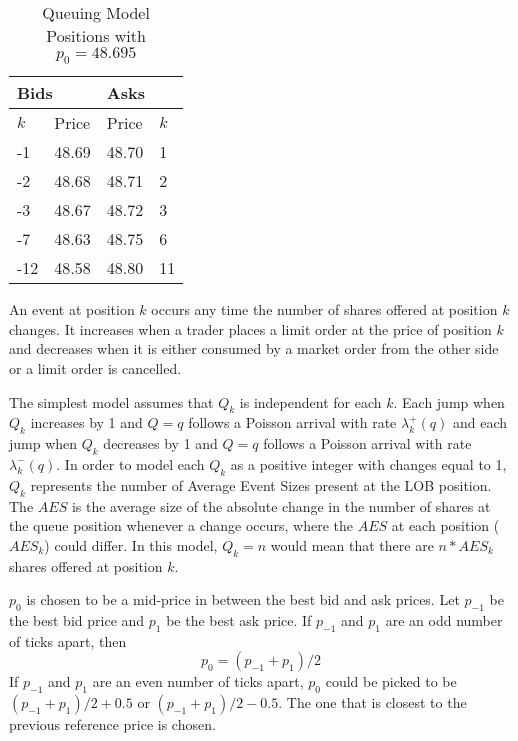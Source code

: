 \begin{table}[htbp]
\caption{Queuing Model Positions with $p_0 = 48.695$} \label{tab:queue_positions}
\begin{center}
\begin{tabular}{ll|ll}
\hline \hline
\multicolumn{2}{l|}{\textbf{Bids}} & \multicolumn{2}{l}{\textbf{Asks}} \\
\hline
$k$          & Price          & Price           & $k$          \\
\hline
-1             & 48.69          & 48.70           & 1             \\
-2             & 48.68          & 48.71           & 2            \\
-3             & 48.67          & 48.72           & 3            \\
-7             & 48.63          & 48.75           & 6            \\
-12             & 48.58          & 48.80           & 11          
\end{tabular}
\end{center}
\end{table}

An event at position $k$ occurs any time the number of shares offered at position $k$ changes. It increases when a trader places a limit order at the price of position $k$ and decreases when it is either consumed by a market order from the other side or a limit order is cancelled.

The simplest model assumes that $Q_k$ is independent for each $k$. Each jump when $Q_k$ increases by 1 and $Q = q$ follows a Poisson arrival with rate $\lambda^+_k(q)$ and each jump when $Q_k$ decreases by 1 and $Q = q$ follows a Poisson arrival with rate $\lambda^-_k(q)$. In order to model each $Q_k$ as a positive integer with changes equal to 1, $Q_k$ represents the number of Average Event Sizes present at the LOB position. The $AES$ is the average size of the absolute change in the number of shares at the queue position whenever a change occurs, where the $AES$ at each position ($AES_k$) could differ. In this model, $Q_k = n$ would mean that there are $n*AES_k$ shares offered at position $k$.

$p_0$ is chosen to be a mid-price in between the best bid and ask prices. Let $p_{-1}$ be the best bid price and $p_1$ be the best ask price. If $p_{-1}$ and $p_1$ are an odd number of ticks apart, then 
$$p_0=  (p_{-1}+p_1)/2$$
If $p_{-1}$ and $p_1$ are an even number of ticks apart, $p_0$ could be picked to be $(p_{-1}+p_1)/2 + 0.5$ or $(p_{-1}+p_1)/2 - 0.5$. The one that is closest to the previous reference price is chosen.

